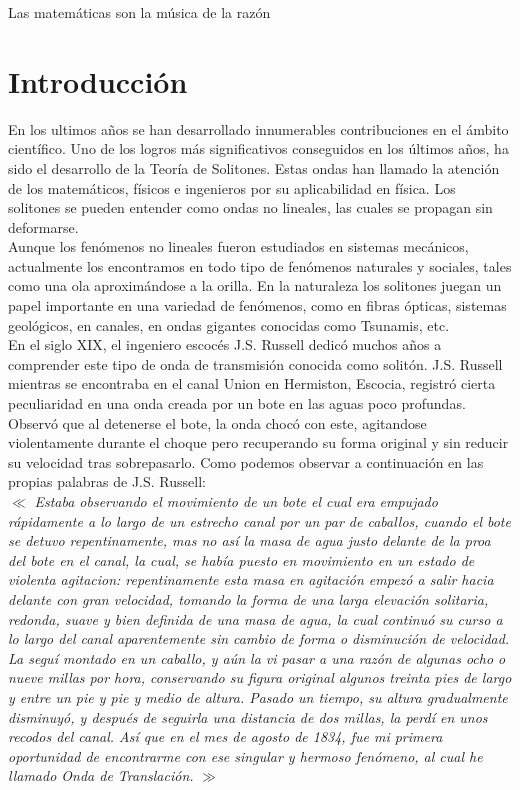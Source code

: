\begin{savequote}[50mm]
Las matemáticas son la música de la razón
\end{savequote}

\chapter{Introducción}

\label{cha:Introduction}

En los ultimos años se han desarrollado innumerables contribuciones en el ámbito científico. Uno de los logros más significativos conseguidos en los últimos años, ha sido el desarrollo de la Teoría de Solitones. Estas ondas han llamado la atención de los matemáticos, físicos e ingenieros por su aplicabilidad en física. Los solitones se pueden entender como ondas no lineales, las cuales se propagan sin deformarse.\\

Aunque los fenómenos no lineales fueron estudiados en sistemas mecánicos, actualmente los encontramos en todo tipo de fenómenos naturales y sociales, tales como una ola aproximándose a la orilla. En la naturaleza los solitones juegan un papel importante en una variedad de fenómenos, como en fibras ópticas, sistemas geológicos, en canales, en ondas gigantes conocidas como Tsunamis, etc.\\

En el siglo XIX, el ingeniero escocés J.S. Russell dedicó muchos años a comprender este tipo de onda de transmisión conocida como solitón. J.S. Russell mientras se encontraba en el canal Union en Hermiston, Escocia, registró cierta peculiaridad en una onda creada por un bote en las aguas poco profundas. Observó que al detenerse el bote, la onda chocó con este, agitandose violentamente durante el choque pero recuperando su forma original y sin reducir su velocidad tras sobrepasarlo. Como podemos observar a continuación en las propias palabras de J.S. Russell:\\

$\ll$ \textit{Estaba observando el movimiento de un bote el cual era empujado rápidamente a lo largo de un estrecho canal por un par de caballos, cuando el bote se detuvo repentinamente, mas no así la masa de agua justo delante de la proa del bote en el canal, la cual, se había puesto en movimiento en un estado de violenta agitacion: repentinamente esta masa en agitación empezó a salir hacia delante con gran velocidad, tomando la forma de una larga elevación solitaria, redonda, suave y bien definida de una masa de agua, la cual continuó su curso a lo largo del canal aparentemente sin cambio de forma o disminución de velocidad. La seguí montado en un caballo, y aún la vi pasar a una razón de algunas ocho o nueve millas por hora, conservando su figura original algunos treinta pies de largo y entre un pie y pie y medio de altura. Pasado un tiempo, su altura gradualmente disminuyó, y después de seguirla una distancia de dos millas, la perdí en unos recodos del canal. Así que en el mes de agosto de 1834, fue mi primera oportunidad de encontrarme con ese singular y hermoso fenómeno, al cual he llamado Onda de Translación.} $\gg$\\

